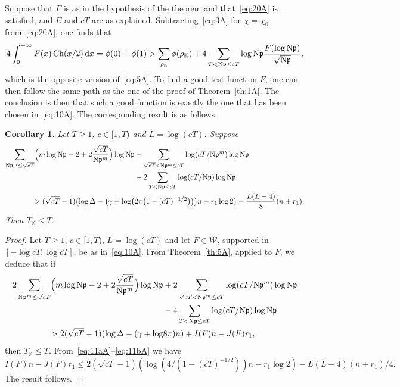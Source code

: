 \documentclass[a4paper,11pt]{amsart}
\newcommand{\field}[1]{\mathbb{{#1}}}
\newcommand{\ideal}[1]{\mathfrak{{#1}}}
\newcommand{\K}{\field{{K}}}
\newcommand{\p}{\ideal{p}}
\newcommand{\Norm}{\textrm{\upshape N}}
\newcommand{\dd}{\,\mathrm{d}}
\newcommand{\W}{\mathcal W}
\DeclareMathOperator{\Ch}{Ch}
\DeclareMathOperator{\dilog}{dilog}
\newtheorem{corollary}{Corollary}
\theoremstyle{remark}
\begin{document}
%
Suppose that $F$ is as in the hypothesis of the theorem and that~\eqref{eq:20A} is satisfied, and $E$ and
$cT$ are as explained. Subtracting~\eqref{eq:3A} for $\chi=\chi_0$ from~\eqref{eq:20A}, one finds that
\[
4\int_0^{+\infty}F(x)\Ch(x/2)\dd x=\phi(0)+\phi(1)>\sum_{\rho_\K}\phi(\rho_\K)
+ 4\sum_{T<\Norm\p\leq cT}\log\Norm\p\frac{F(\log\Norm\p)}{\sqrt{\Norm\p}},
\]
which is the opposite version of~\eqref{eq:5A}. To find a good test function $F$, one can then follow the
same path as the one of the proof of Theorem~\ref{th:1A}. The conclusion is then that such a good
function is exactly the one that has been chosen in~\eqref{eq:10A}. The corresponding result is as
follows.
%
\begin{corollary}\label{cor:1A}
Let $T\geq 1$, $c\in[1,T)$ and $L=\log(cT)$. Suppose
\begin{align*}
\sum_{\Norm\p^m\leq \sqrt{cT}}\Bigl(m\log\Norm\p-2+2\frac{\sqrt{cT}}{\Norm\p^m}\Bigr)\log\Norm\p
&+  \sum_{\sqrt{cT}< \Norm\p^m\leq cT}\log(cT/\Norm\p^m)\log\Norm\p                               \\
&- 2\sum_{T< \Norm\p\leq cT}\log(cT/\Norm\p)\log\Norm\p                                           \\
>
(\sqrt{cT}-1)
\bigl(\log\Delta-\bigl(\gamma+\log\bigl(&2\pi\bigl(1-(cT)^{-1/2}\bigr)\bigr)\bigr)n - r_1\log 2\bigr)
- \frac{L(L-4)}{8}(n+r_1).
\end{align*}
Then $T_\K\leq T$.
\end{corollary}
\begin{proof}
%
Let $T\geq 1$, $c\in[1,T)$, $L=\log(cT)$ and let $F\in \W$, supported in $[-\log cT, \log cT]$, be as
in~\eqref{eq:10A}. From Theorem~\ref{th:5A}, applied to $F$, we deduce that if
%
\begin{align*}
2\sum_{\Norm\p^m\leq \sqrt{cT}}\Bigl(m\log\Norm\p - 2 + 2\frac{\sqrt{cT}}{\Norm\p^m}\Bigr)\log\Norm\p
&+ 2\sum_{\sqrt{cT}< \Norm\p^m\leq cT}\log(cT/\Norm\p^m)\log\Norm\p                                \\
&- 4\sum_{T< \Norm\p\leq cT}\log(cT/\Norm\p)\log\Norm\p                                            \\
>
2(\sqrt{cT}-1)(\log\Delta - (\gamma + \log &8\pi)n)
+ I(F) n
- J(F) r_1,
\end{align*}
then $T_\K\leq T$. From~\eqref{eq:11aA}--\eqref{eq:11bA} we have
\[
I(F) n - J(F) r_1
\leq 2(\sqrt{cT}-1)(\log(4/(1-(cT)^{-1/2}))n - r_1\log 2)-L(L-4)(n+r_1)/4.
\]
%
%
%
%
The result follows.
\end{proof}
\end{document}
